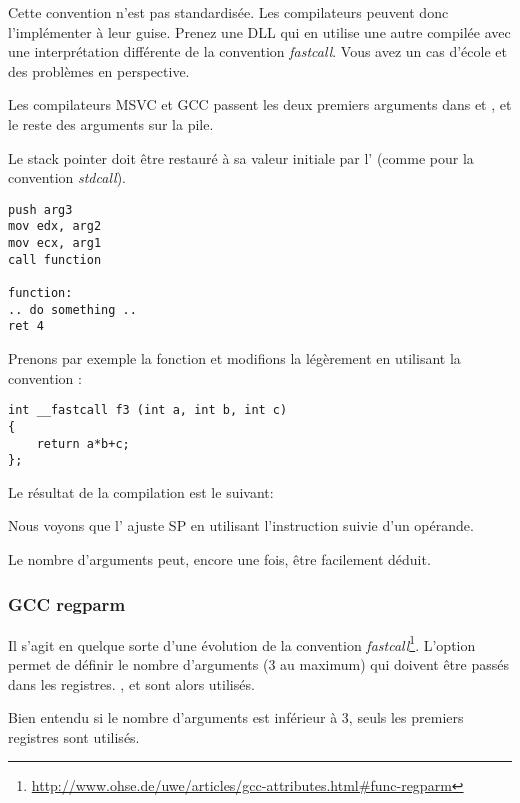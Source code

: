 Cette convention n'est pas standardisée. Les compilateurs peuvent donc l'implémenter à leur guise.
Prenez une DLL qui en utilise une autre compilée avec une interprétation différente de la convention
\emph{fastcall}. Vous avez un cas d'école et des problèmes en perspective.

Les compilateurs MSVC et GCC passent les deux premiers arguments dans \ECX et \EDX, et le reste des
arguments sur la pile.

Le \gls{stack pointer} doit être restauré à sa valeur initiale par l'
(comme pour la convention \emph{stdcall}).

\begin{lstlisting}[caption=fastcall,style=customasmx86]
push arg3
mov edx, arg2
mov ecx, arg1
call function

function:
.. do something ..
ret 4
\end{lstlisting}

Prenons par exemple la fonction  et modifions la légèrement en utilisant la convention  :

\begin{lstlisting}[style=customc]
int __fastcall f3 (int a, int b, int c)
{
	return a*b+c;
};
\end{lstlisting}

Le résultat de la compilation est le suivant:



Nous voyons que l' ajuste \ac{SP} en utilisant l'instruction  suivie d'un opérande.

Le nombre d'arguments peut, encore une fois, être facilement déduit.

\subsubsection{GCC regparm}

\newcommand{\URLREGPARMM}{\url{http://www.ohse.de/uwe/articles/gcc-attributes.html\#func-regparm}}

Il s'agit en quelque sorte d'une évolution de la convention \emph{fastcall}\footnote{\URLREGPARMM}.
L'option  permet de définir le nombre d'arguments (3 au maximum) qui doivent être passés
dans les registres. \EAX, \EDX et \ECX sont alors utilisés.

Bien entendu si le nombre d'arguments est inférieur à 3, seuls les premiers registres sont utilisés.

